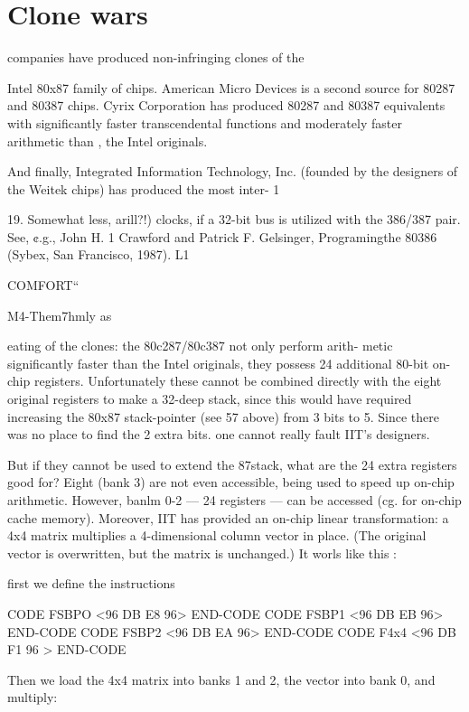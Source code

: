 {{{{{ 

\section{Clone wars}

 companies have produced non-infringing clones of the

Intel 80x87 family of chips. American Micro Devices is a second
source for 80287 and 80387 chips. Cyrix Corporation has
produced 80287 and 80387 equivalents with significantly faster
transcendental functions and moderately faster arithmetic than ,
the Intel originals.

And finally, Integrated Information Technology, Inc. (founded by
the designers of the Weitek chips) has produced the most inter- 1

 

19. Somewhat less, arill?!) clocks, if a 32-bit bus is utilized with the 386/387 pair. See, ¢.g., John H. 1
Crawford and Patrick F. Gelsinger, Programingthe 80386 (Sybex, San Francisco, 1987). L1

COMFORT“

M4-Them7hmly as

eating of the clones: the 80c287/80c387 not only perform arith-
metic significantly faster than the Intel originals, they possess 24
additional 80-bit on-chip registers. Unfortunately these cannot
be combined directly with the eight original registers to make a
32-deep stack, since this would have required increasing the
80x87 stack-pointer (see 57 above) from 3 bits to 5. Since there
was no place to find the 2 extra bits. one cannot really fault IIT's
designers.

But if they cannot be used to extend the 87stack, what are the 24
extra registers good for? Eight (bank 3) are not even accessible,
being used to speed up on-chip arithmetic. However, banlm 0-2
— 24 registers — can be accessed (cg. for on-chip cache memory).
Moreover, IIT has provided an on-chip linear transformation: a
4x4 matrix multiplies a 4-dimensional column vector in place. (The
original vector is overwritten, but the matrix is unchanged.) It worls
like this :

first we define the instructions

CODE FSBPO <96 DB E8 96> END-CODE
CODE FSBP1 <96 DB EB 96> END-CODE
CODE FSBP2 <96 DB EA 96> END-CODE
CODE F4x4 <96 DB F1 96 > END-CODE

Then we load the 4x4 matrix into banks 1 and 2, the vector into
bank 0, and multiply:

}}}}}
